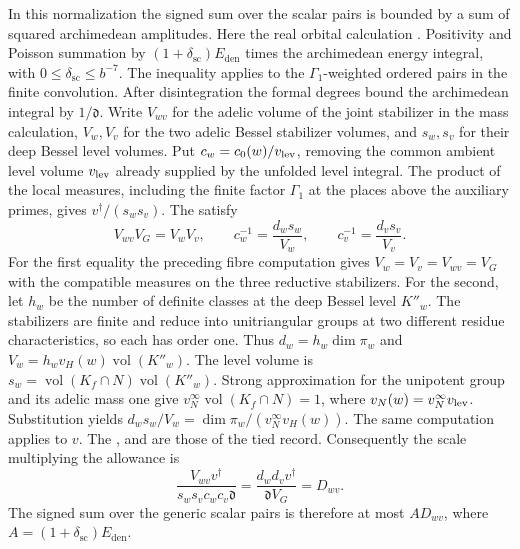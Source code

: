 In this normalization the signed sum over the scalar pairs is bounded
by a sum of squared archimedean amplitudes. Here the real orbital
calculation
.
Positivity and Poisson summation
by \((1+\delta_{\mathrm{sc}})E_{\mathrm{den}}\) times
the archimedean energy integral, with \(0\le\delta_{\mathrm{sc}}\le b^{-7}\).
The inequality applies to the \(\Gamma_1\)-weighted ordered pairs in
the finite convolution. After disintegration the formal degrees bound
the archimedean integral by \(1/\mathfrak d\). Write \(V_{wv}\) for the
adelic volume of the joint stabilizer in the mass calculation,
\(V_w,V_v\) for the two adelic Bessel stabilizer volumes, and \(s_w,s_v\)
for their deep Bessel level volumes. Put
\(c_w=c_0(w)/v_{\rm lev}\), removing the common ambient level volume
\(v_{\rm lev}\) already supplied by the unfolded level integral.
The product of the local measures, including the finite factor
\(\Gamma_1\) at the places above the auxiliary primes, gives
\(v^\dagger/(s_ws_v)\). The
satisfy
\[
  V_{wv}V_G=V_wV_v,\qquad
  c_w^{-1}=\frac{d_ws_w}{V_w},\qquad
  c_v^{-1}=\frac{d_vs_v}{V_v}.
\]
For the first equality the preceding fibre computation gives
\(V_w=V_v=V_{wv}=V_G\) with the compatible measures on the
three reductive stabilizers. For the second, let \(h_w\) be the
number of definite classes at the deep Bessel level \(K''_w\).
The stabilizers are finite and reduce into unitriangular groups at
two different residue characteristics, so each has order one.
Thus \(d_w=h_w\dim\pi_w\) and
\(V_w=h_wv_H(w)\operatorname{vol}(K''_w)\).
The level volume is
\(s_w=\operatorname{vol}(K_f\cap N)\operatorname{vol}(K''_w)\).
Strong approximation for the unipotent group and its adelic mass
one give \(v_N^\infty\operatorname{vol}(K_f\cap N)=1\), where
\(v_N(w)=v_N^\infty v_{\rm lev}\).
Substitution yields \(d_ws_w/V_w=\dim\pi_w/(v_N^\infty v_H(w))\).
The same computation applies to \(v\). The
,
and 
are those of the tied record.
Consequently the scale multiplying the allowance is
\[
  \frac{V_{wv}v^\dagger}{s_ws_v c_wc_v\mathfrak d}
   =\frac{d_wd_v v^\dagger}{\mathfrak d V_G}=D_{wv}.
\]
The signed sum over the generic scalar pairs is therefore at most
\(A D_{wv}\), where \(A=(1+\delta_{\mathrm{sc}})E_{\mathrm{den}}\).

